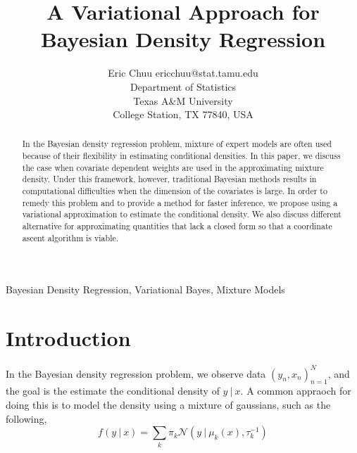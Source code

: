 \documentclass[twoside,11pt]{article}
\newcommand\given[1][]{\:#1\vert\:}
\begin{document}
\title{A Variational Approach for Bayesian Density Regression}

\author{\name Eric Chuu \email ericchuu@stat.tamu.edu \\
       \addr Department of Statistics\\
       Texas A\&M University \\
       College Station, TX 77840, USA}

\maketitle

\begin{abstract}%
In the Bayesian density regression problem, mixture of expert models are often used because of their flexibility in estimating conditional densities. In this paper, we discuss the case when covariate dependent weights are used in the approximating mixture density. Under this framework, however, traditional Bayesian methods results in computational difficulties when the dimension of the covariates is large. In order to remedy this problem and to provide a method for faster inference, we propose using a variational approximation to estimate the conditional density. We also discuss different alternative for approximating quantities that lack a closed form so that a coordinate ascent algorithm is viable.
\end{abstract}

\begin{keywords}
  Bayesian Density Regression, Variational Bayes, Mixture Models
\end{keywords}

\section{Introduction}

In the Bayesian density regression problem, we observe data $\left(y_n, x_n \right)_{n=1}^N$, and the goal is the estimate the conditional density of $y \given x$. A common appraoch for doing this is to model the density using a mixture of gaussians, such as the following,
\begin{equation} \label{eq:general_gm}
	f(y \given x) = \sum_{k} \pi_k \mathcal{N} \left(y \given \mu_k(x), \tau_k^{-1} \right)
\end{equation}
\end{document}
